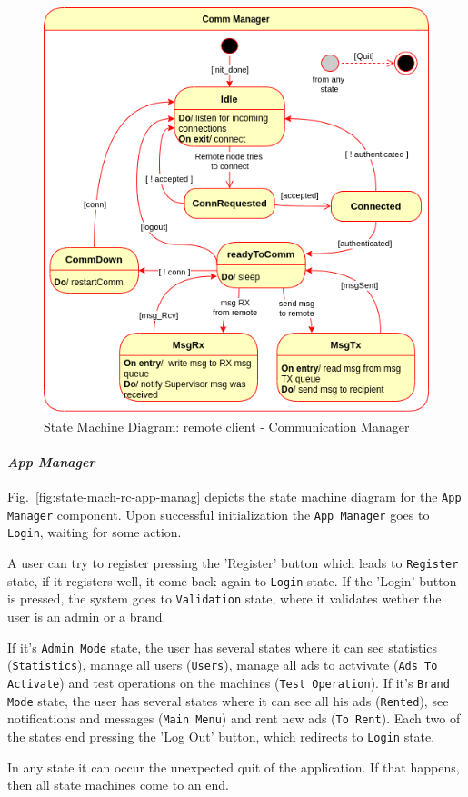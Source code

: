 \begin{figure}[htb!]
\centering
    \includegraphics[width=0.5\columnwidth]{./img/state-mach-rc-comm.png}
  \caption{State Machine Diagram: remote client - Communication Manager}%
\label{fig:state-mach-rc-comm}
\end{figure}
%

\paragraph{\emph{App Manager}}
Fig.~\ref{fig:state-mach-rc-app-manag} depicts the state machine diagram for the
\texttt{App Manager} component.
Upon successful initialization the
\texttt{App Manager} goes to \texttt{Login}, waiting for some action. 

A user can try to register pressing the 'Register' button which leads to \texttt{Register} state, if it registers well, it come back again to \texttt{Login} state. 
If the 'Login' button is pressed, the system goes to \texttt{Validation} state, where it validates wether the user is an admin or a brand.

If it's \texttt{Admin Mode} state, the user has several states where it can see statistics (\texttt{Statistics}), manage all users (\texttt{Users}), manage all ads to actvivate (\texttt{Ads To Activate}) and test operations on the machines (\texttt{Test Operation}).
If it's \texttt{Brand Mode} state, the user has several states where it can see all his ads (\texttt{Rented}), see notifications and messages (\texttt{Main Menu}) and rent new ads (\texttt{To Rent}). 
Each two of the states end pressing the 'Log Out' button, which redirects to \texttt{Login}  state.

In any state it can occur the unexpected quit of the application. If that happens, then all state machines come to an end.  

